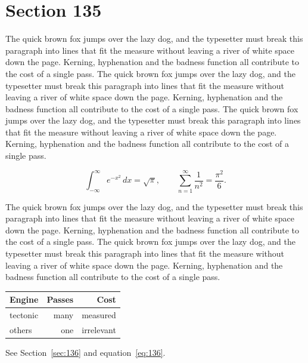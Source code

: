 \documentclass{article}
\begin{document}
\section{Section 135}
\label{sec:135}
The quick brown fox jumps over the lazy dog, and the typesetter must break this paragraph into lines that fit the measure without leaving a river of white space down the page. Kerning, hyphenation and the badness function all contribute to the cost of a single pass. The quick brown fox jumps over the lazy dog, and the typesetter must break this paragraph into lines that fit the measure without leaving a river of white space down the page. Kerning, hyphenation and the badness function all contribute to the cost of a single pass. The quick brown fox jumps over the lazy dog, and the typesetter must break this paragraph into lines that fit the measure without leaving a river of white space down the page. Kerning, hyphenation and the badness function all contribute to the cost of a single pass. 

\begin{equation}\label{eq:135}
\int_{-\infty}^{\infty} e^{-x^{2}}\,dx = \sqrt{\pi}, \qquad
\sum_{n=1}^{\infty} \frac{1}{n^{2}} = \frac{\pi^{2}}{6}.
\end{equation}

The quick brown fox jumps over the lazy dog, and the typesetter must break this paragraph into lines that fit the measure without leaving a river of white space down the page. Kerning, hyphenation and the badness function all contribute to the cost of a single pass. The quick brown fox jumps over the lazy dog, and the typesetter must break this paragraph into lines that fit the measure without leaving a river of white space down the page. Kerning, hyphenation and the badness function all contribute to the cost of a single pass. 

\begin{center}
\begin{tabular}{lrr}
\toprule
Engine & Passes & Cost \\
\midrule
tectonic & many & measured \\
others & one & irrelevant \\
\bottomrule
\end{tabular}
\end{center}

See Section~\ref{sec:136} and equation~\eqref{eq:136}.
\end{document}
